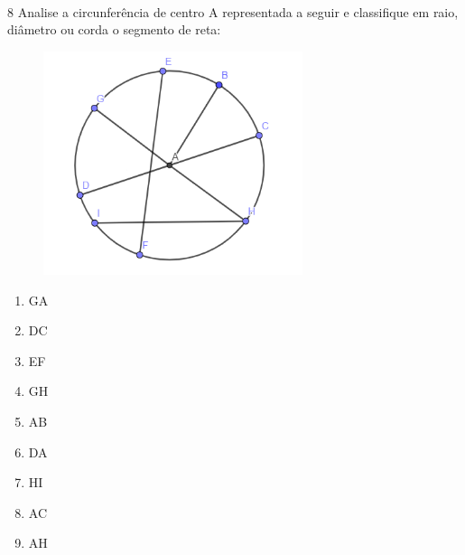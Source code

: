 \\
\\
\\

\pagebreak

\num{8} Analise a circunferência de centro A representada a seguir e
classifique em raio, diâmetro ou corda o segmento de reta:

\begin{figure}[H]
\centering\includegraphics[width=2.98681in,height=2.57292in]{./imgSAEB_8_MAT/media/image12.png}
\end{figure}

\begin{enumerate}
\item GA

\item DC

\item EF

\item GH

\item AB

\item DA

\item HI

\item AC

\item AH

\end{enumerate}

